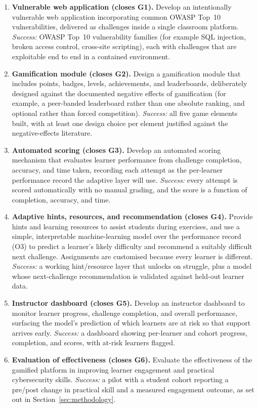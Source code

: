 \begin{enumerate}[label=\textbf{O\arabic*.},leftmargin=2.6em,itemsep=0.45em]

\item \textbf{Vulnerable web application (closes G1).}
Develop an intentionally vulnerable web application incorporating common OWASP
Top~10 vulnerabilities, delivered as challenges inside a single classroom platform.
\emph{Success:} OWASP Top~10 vulnerability families (for example SQL injection,
broken access control, cross-site scripting), each with challenges that are
exploitable end to end in a contained environment.

\item \textbf{Gamification module (closes G2).}
Design a gamification module that includes points, badges, levels, achievements, and
leaderboards, deliberately designed against the documented negative effects of
gamification (for example, a peer-banded leaderboard rather than one absolute
ranking, and optional rather than forced competition).
\emph{Success:} all five game elements built, with at least one design choice
per element justified against the negative-effects literature.

\item \textbf{Automated scoring (closes G3).}
Develop an automated scoring mechanism that evaluates learner performance from
challenge completion, accuracy, and time taken, recording each attempt as the
per-learner performance record the adaptive layer will use.
\emph{Success:} every attempt is scored automatically with no manual grading, and
the score is a function of completion, accuracy, and time.

\item \textbf{Adaptive hints, resources, and recommendation (closes G4).}
Provide hints and learning resources to assist students during exercises, and use a
simple, interpretable machine-learning model over the performance record (O3) to
predict a learner's likely difficulty and recommend a suitably difficult next
challenge. Assignments are customised because every learner is different.
\emph{Success:} a working hint/resource layer that unlocks on struggle, plus a
model whose next-challenge recommendation is validated against held-out learner
data.

\item \textbf{Instructor dashboard (closes G5).}
Develop an instructor dashboard to monitor learner progress, challenge completion,
and overall performance, surfacing the model's prediction of which learners are at
risk so that support arrives early.
\emph{Success:} a dashboard showing per-learner and cohort progress, completion, and
scores, with at-risk learners flagged.

\item \textbf{Evaluation of effectiveness (closes G6).}
Evaluate the effectiveness of the gamified platform in improving learner engagement
and practical cybersecurity skills.
\emph{Success:} a pilot with a student cohort reporting a pre/post change in
practical skill and a measured engagement outcome, as set out in
Section~\ref{sec:methodology}.

\end{enumerate}

